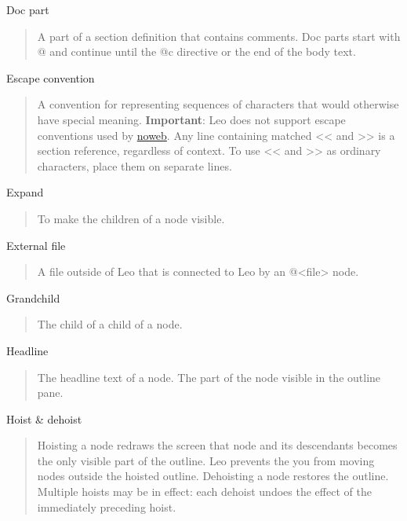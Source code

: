 \documentclass[a4paper,10pt,english]{sphinxmanual}
\begin{document}
Doc part
\begin{quote}

A part of a section definition that contains comments. Doc parts start with
@ and continue until the @c directive or the end of the body text.
\end{quote}

Escape convention
\begin{quote}

A convention for representing sequences of characters that would otherwise
have special meaning. \textbf{Important}: Leo does not support escape conventions
used by \href{http://www.eecs.harvard.edu/~nr/noweb/}{noweb}. Any line containing matched \textless{}\textless{} and \textgreater{}\textgreater{} is a section
reference, regardless of context. To use \textless{}\textless{} and \textgreater{}\textgreater{} as ordinary characters,
place them on separate lines.
\end{quote}

Expand
\begin{quote}

To make the children of a node visible.
\end{quote}

External file
\begin{quote}

A file outside of Leo that is connected to Leo by an @\textless{}file\textgreater{} node.
\end{quote}

Grandchild
\begin{quote}

The child of a child of a node.
\end{quote}

Headline
\begin{quote}

The headline text of a node.  The part of the node visible in the outline pane.
\end{quote}

Hoist \& dehoist
\begin{quote}

Hoisting a node redraws the screen that node and its descendants becomes the
only visible part of the outline. Leo prevents the you from moving nodes
outside the hoisted outline. Dehoisting a node restores the outline.
Multiple hoists may be in effect: each dehoist undoes the effect of the
immediately preceding hoist.
\end{quote}
\end{document}
